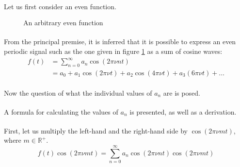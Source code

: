 \documentclass{article}
\begin{document}
\paragraph*{}
Let us first consider an even function.

\begin{figure}[ht]
	\centering
	\caption{An arbitrary even function}
	\label{fig:odd-arb-func}
\end{figure}

\paragraph*{}
From the principal premise, it is inferred that it is possible to express an
even periodic signal such as the one given in figure \ref{fig:odd-arb-func} as
a sum of cosine waves:
\begin{align*}
	f(t) &= \sum^{\infty}_{n=0}a_n \cos(2 \pi \nu n t) \\
	&= a_0 + a_1 \cos(2 \pi \nu t) + a_2 \cos (4 \pi \nu t) + a_3 (6 \pi \nu t) + \dots
\end{align*}

\paragraph*{}
Now the question of what the individual values of $a_n$ are is posed.

\paragraph*{}
A formula for calculating the values of $a_n$ is presented, as well as a
derivation.

\paragraph*{}
First, let us multiply the left-hand and the right-hand side by $\cos(2 \pi \nu
m t)$, where $m \in \mathbb{R}^+$.
$$f(t) \cos(2 \pi \nu m t) = \sum^{\infty}_{n=0}a_n \cos(2 \pi \nu n t) \cos(2
\pi \nu m t)$$
\end{document}
